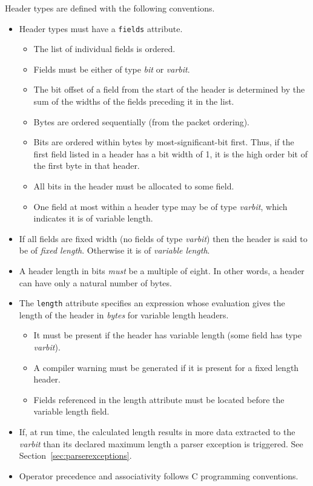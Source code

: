 \documentclass[12pt]{article}
\begin{document}
Header types are defined with the following conventions.
\begin{itemize}
\item
Header types must have a \texttt{fields} attribute. 
\begin{itemize}
\item
The list of individual fields is ordered.
\item
Fields must be either of type \textit{bit} or \textit{varbit}.
\item
The bit offset of a field from the start of the header is determined by the 
sum of the widths of the fields preceding it in the list.
\item
Bytes are ordered sequentially (from the packet ordering).
\item
Bits are ordered within bytes by most-significant-bit first.  Thus, if the 
first field listed in a header has a bit width of 1, it is the high order 
bit of the first byte in that header.
\item
All bits in the header must be allocated to some field.
\item
One field at most within a header type may be of type \textit{varbit}, which 
indicates it is of variable length.
\end{itemize}

\item
If all fields are fixed width (no fields of type \textit{varbit}) then the header is 
said to be of \textit{fixed length}. Otherwise it is of \textit{variable length}.
\item
A header length in bits \textit{must} be a multiple of eight. In other words, a 
header can have only a natural number of bytes.
\item
The \texttt{length} attribute specifies an expression whose evaluation gives
the length  of the header in \textit{bytes} for variable length headers. 
\begin{itemize}
\item
It must be present if the header has variable length (some field has type  
\textit{varbit}).
\item
A compiler warning must be generated if it is present for a fixed length header.
\item
Fields referenced in the length attribute must be located before the variable 
length field.
\end{itemize}
\item
If, at run time, the calculated length results in more data extracted to
the \textit{varbit} than its declared maximum length a parser exception is
triggered. See Section~\ref{sec:parserexceptions}.

\item
Operator precedence and associativity follows C programming conventions.
\end{itemize}
\end{document}
